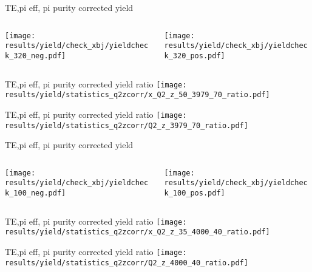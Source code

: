 \begin{frame}{TE,pi eff, pi purity corrected yield}
\begin{columns}
\begin{column}[T]{0.5\textwidth}
\texttt{[image: results/yield/check\_xbj/yieldcheck\_320\_neg.pdf]}
\end{column}
\begin{column}[T]{0.5\textwidth}
\texttt{[image: results/yield/check\_xbj/yieldcheck\_320\_pos.pdf]}
\end{column}
\end{columns}
\end{frame}
\begin{frame}{TE,pi eff, pi purity corrected yield ratio}
\texttt{[image: results/yield/statistics\_q2zcorr/x\_Q2\_z\_50\_3979\_70\_ratio.pdf]}
\end{frame}
\begin{frame}{TE,pi eff, pi purity corrected yield ratio}
\texttt{[image: results/yield/statistics\_q2zcorr/Q2\_z\_3979\_70\_ratio.pdf]}
\end{frame}
\begin{frame}{TE,pi eff, pi purity corrected yield}
\begin{columns}
\begin{column}[T]{0.5\textwidth}
\texttt{[image: results/yield/check\_xbj/yieldcheck\_100\_neg.pdf]}
\end{column}
\begin{column}[T]{0.5\textwidth}
\texttt{[image: results/yield/check\_xbj/yieldcheck\_100\_pos.pdf]}
\end{column}
\end{columns}
\end{frame}
\begin{frame}{TE,pi eff, pi purity corrected yield ratio}
\texttt{[image: results/yield/statistics\_q2zcorr/x\_Q2\_z\_35\_4000\_40\_ratio.pdf]}
\end{frame}
\begin{frame}{TE,pi eff, pi purity corrected yield ratio}
\texttt{[image: results/yield/statistics\_q2zcorr/Q2\_z\_4000\_40\_ratio.pdf]}
\end{frame}

